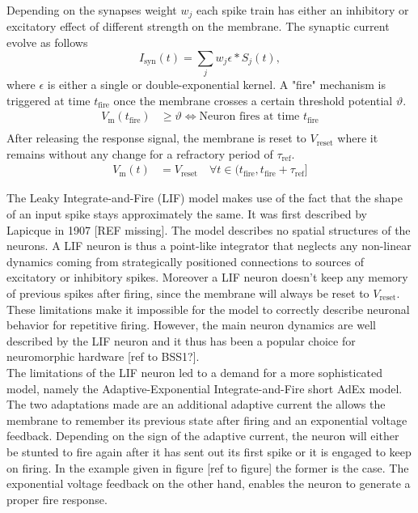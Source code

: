Depending on the synapses weight $w_j$ each spike train has either an inhibitory or excitatory effect of different strength on the membrane. The synaptic current evolve as follows
 \begin{equation}
 I_{\text{syn}}(t) = \sum_j w_j \epsilon \ast S_j(t), 
 \end{equation}
where $\epsilon$ is either a single or double-exponential kernel. %
A "fire" mechanism is triggered at time $t_{\text{fire}}$ once the membrane crosses a certain threshold potential $\mathcal{\vartheta}$. 
\begin{align}
V_{\text{m}}(t_{\text{fire}}) &\ge \vartheta \Leftrightarrow \text{Neuron fires at time } t_{\text{fire}} \\
\end{align}
After releasing the response signal, the membrane is reset to $V_{\text{reset}}$ where it remains without any change for a refractory period of $\tau_{\text{ref}}$. 
\begin{align}
V_{\text{m}}(t) &= V_{\text{reset}} \quad \forall t \in (t_{\text{fire}}, t_{\text{fire}} + \tau_{\text{ref}}] 
\end{align}


The Leaky Integrate-and-Fire (LIF) model makes use of the fact that the shape of an input spike stays approximately the same. It was first described by Lapicque in 1907 [REF missing]. The model describes no spatial structures of the neurons. A LIF neuron is thus a point-like integrator that neglects any non-linear dynamics coming from strategically positioned connections to sources of excitatory or inhibitory spikes. Moreover a LIF neuron doesn't keep any memory of previous spikes after firing, since the membrane will always be reset to $V_{\text{reset}}$. These limitations make it impossible for the model to correctly describe neuronal behavior for repetitive firing. However, the main neuron dynamics are well described by the LIF neuron and it thus has been a popular choice for neuromorphic hardware [ref to BSS1?].\\

The limitations of the LIF neuron led to a demand for a more sophisticated model, namely the Adaptive-Exponential Integrate-and-Fire short AdEx model. The two adaptations made are an additional adaptive current the allows the membrane to remember its previous state after firing and an exponential voltage feedback. Depending on the sign of the adaptive current, the neuron will either be stunted to fire again after it has sent out its first spike or it is engaged to keep on firing. In the example given in figure [ref to figure] the former is the case. The exponential voltage feedback on the other hand, enables the neuron to generate a proper fire response.\\

